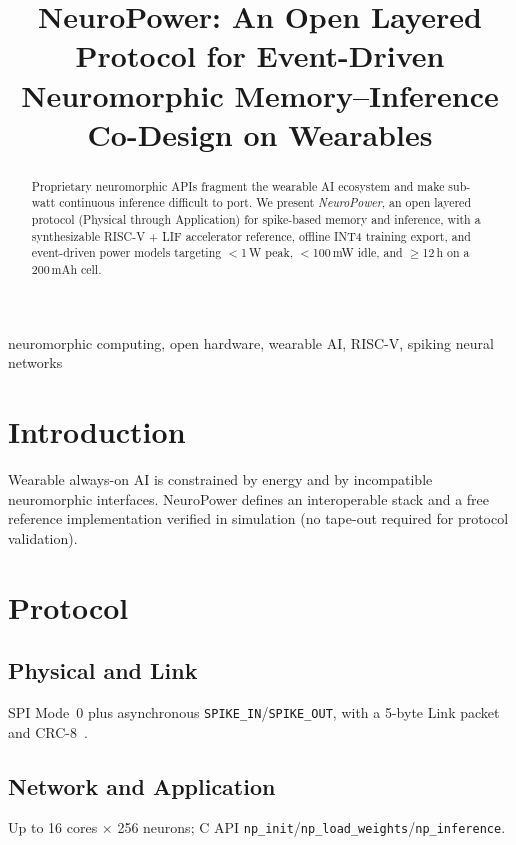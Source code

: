 \documentclass[conference]{IEEEtran}
\begin{document}
\title{NeuroPower: An Open Layered Protocol for Event-Driven Neuromorphic Memory--Inference Co-Design on Wearables}

\author{
}

\maketitle

\begin{abstract}
Proprietary neuromorphic APIs fragment the wearable AI ecosystem and make sub-watt continuous inference difficult to port. We present \emph{NeuroPower}, an open layered protocol (Physical through Application) for spike-based memory and inference, with a synthesizable RISC-V + LIF accelerator reference, offline INT4 training export, and event-driven power models targeting $<$1\,W peak, $<$100\,mW idle, and $\geq$12\,h on a 200\,mAh cell.
\end{abstract}

\begin{IEEEkeywords}
neuromorphic computing, open hardware, wearable AI, RISC-V, spiking neural networks
\end{IEEEkeywords}

\section{Introduction}
Wearable always-on AI is constrained by energy and by incompatible neuromorphic interfaces. NeuroPower defines an interoperable stack and a free reference implementation verified in simulation (no tape-out required for protocol validation).

\section{Protocol}
\subsection{Physical and Link}
SPI Mode~0 plus asynchronous \texttt{SPIKE\_IN}/\texttt{SPIKE\_OUT}, with a 5-byte Link packet and CRC-8~\cite{neuropower-spec}.

\subsection{Network and Application}
Up to 16 cores $\times$ 256 neurons; C API \texttt{np\_init}/\texttt{np\_load\_weights}/\texttt{np\_inference}.
\end{document}
